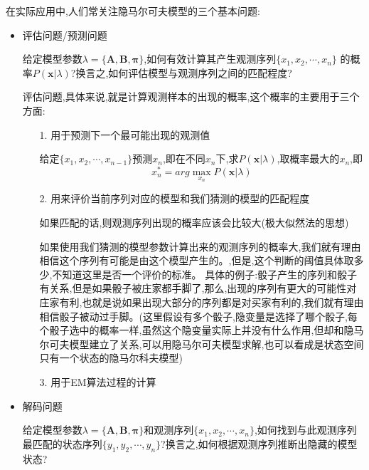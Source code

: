 \documentclass[UTF8,a4paper]{ctexart}%
\begin{document}
            在实际应用中,人们常关注隐马尔可夫模型的三个基本问题:
            \begin{itemize}
              \item 评估问题/预测问题

                  给定模型参数$\lambda = \{\bm{A,B,\pi}\}$,如何有效计算其产生观测序列$\{x_1, x_2, \cdots , x_n\}$ 的概率$P(\bm{x} | \lambda)$?换言之,如何评估模型与观测序列之间的匹配程度?

                  {\color{blue}

                  评估问题,具体来说,就是计算观测样本的出现的概率,这个概率的主要用于三个方面:

                  \begin{itemize}
                    \item [1.] 用于预测下一个最可能出现的观测值

                          给定$\{x_1, x_2, \cdots , x_{n-1}\}$预测$x_n$,即在不同$x_n$下,求$P(\bm{x} | \lambda)$,取概率最大的$x_n$,即
                              \[ x_n^* = arg \max_{x_n} P(\bm{x} | \lambda) \]

                    \item [2.] 用来评价当前序列对应的模型和我们猜测的模型的匹配程度

                          如果匹配的话,则观测序列出现的概率应该会比较大(极大似然法的思想)

                          如果使用我们猜测的模型参数计算出来的观测序列的概率大,我们就有理由相信这个序列有可能是由这个模型产生的。{\color{red},但是,这个判断的阈值具体取多少,不知道这里是否一个评价的标准。}
                          具体的例子:骰子产生的序列和骰子有关系,但是如果骰子被庄家都手脚了,那么,出现的序列有更大的可能性对庄家有利,也就是说如果出现大部分的序列都是对买家有利的,我们就有理由相信骰子被动过手脚。(这里假设有多个骰子,隐变量是选择了哪个骰子,每个骰子选中的概率一样,虽然这个隐变量实际上并没有什么作用,但却和隐马尔可夫模型建立了关系,可以用隐马尔可夫模型求解,也可以看成是状态空间只有一个状态的隐马尔科夫模型)\\

                    \item [3.] 用于EM算法过程的计算
                  \end{itemize}
                  }

              \item 解码问题

                  给定模型参数$\lambda = \{\bm{A,B,\pi}\}$和观测序列$\{x_1, x_2, \cdots , x_n\}$,如何找到与此观测序列最匹配的状态序列$\{y_1,y_2 , \cdots , y_n\}$?换言之,如何根据观测序列推断出隐藏的模型状态?


\end{itemize}
\end{document}
